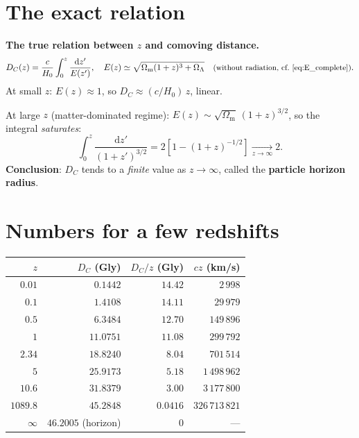 \documentclass[11pt,a4paper,openany]{report}
\newcommand{\Hzero}{H_{0}}
\newcommand{\Om}{\Omega_{\mathrm{m}}}
\newcommand{\OL}{\Omega_{\Lambda}}
\newcommand{\dif}{\mathrm{d}}
\begin{document}
\section{The exact relation}

\begin{tcolorbox}[undergrad]
\textbf{The true relation between $z$ and comoving distance.}
\[
D_{C}(z) = \frac{c}{\Hzero}\int_{0}^{z}\frac{\dif z'}{E(z')},
\quad E(z) \simeq \sqrt{\Om(1+z)^{3} + \OL}
\quad\text{\small(without radiation, cf.~\eqref{eq:E_complete})}.
\]
At small $z$: $E(z) \approx 1$, so $D_C \approx (c/\Hzero)\,z$, linear.

\medskip
At large $z$ (matter-dominated regime): $E(z) \sim \sqrt{\Om}\,(1+z)^{3/2}$, so
the integral \emph{saturates}:
\[
\int_{0}^{z}\frac{\dif z'}{(1+z')^{3/2}}
  = 2\left[1 - (1+z)^{-1/2}\right] \xrightarrow[z\to\infty]{} 2.
\]
\textbf{Conclusion}: $D_C$ tends to a \emph{finite} value as $z\to\infty$,
called the \textbf{particle horizon radius}.
\end{tcolorbox}

\section{Numbers for a few redshifts}

\begin{center}
\renewcommand{\arraystretch}{1.3}
\begin{tabular}{rrrr}
\toprule
\textbf{$z$} & \textbf{$D_C$ (Gly)} & \textbf{$D_C / z$ (Gly)} & \textbf{$cz$ (km/s)} \\
\midrule
$0.01$   & $0.1442$          & $14.42$  & $2\,998$ \\
$0.1$    & $1.4108$          & $14.11$  & $29\,979$ \\
$0.5$    & $6.3484$          & $12.70$  & $149\,896$ \\
$1$      & $11.0751$         & $11.08$  & $299\,792$ \\
$2.34$   & $18.8240$         & $8.04$   & $701\,514$ \\
$5$      & $25.9173$         & $5.18$   & $1\,498\,962$ \\
$10.6$   & $31.8379$         & $3.00$   & $3\,177\,800$ \\
$1089.8$ & $45.2848$         & $0.0416$ & $326\,713\,821$ \\
$\infty$ & $46.2005$ (horizon) & $0$    & --- \\
\bottomrule
\end{tabular}
\end{center}
\end{document}
